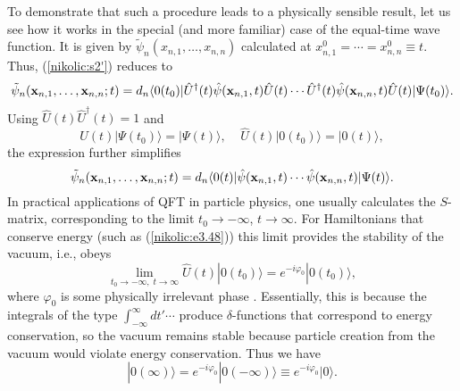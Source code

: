 \documentclass[12pt,twoside]{report} %
\begin{document}
To demonstrate that such a procedure leads to a physically sensible result,
let us see how it works in the special (and more familiar) case of the equal-time
wave function. It is given by $\tilde{\psi}_n(x_{n,1},\ldots,x_{n,n})$ 
calculated at $x^0_{n,1}=\cdots=x^0_{n,n}\equiv t$.
Thus, (\ref{nikolic:s2'}) reduces to
\begin{equation}\label{nikolic:e3.51}
 \tilde{\psi}_n({\bf x}_{n,1},\ldots,{\bf x}_{n,n};t) = d_n
\langle 0(t_0)|  \hat{U}^\dagger(t) \hat{\psi}({\bf x}_{n,1},t) \hat{U}(t) 
 \cdots
\hat{U}^\dagger(t) \hat{\psi}({\bf x}_{n,n},t) \hat{U}(t)   |\Psi(t_0)\rangle .  
\end{equation}
Using $\hat{U}(t)\hat{U}^\dagger(t)=1$ and
\begin{equation}\label{nikolic:e3.52}
 \hat{U}(t)   |\Psi(t_0)\rangle = |\Psi(t)\rangle , \;\;\;\;
\hat{U}(t)   |0(t_0)\rangle = |0(t)\rangle ,
\end{equation}
the expression further simplifies 
\begin{equation}\label{nikolic:e3.53}
 \tilde{\psi}_n({\bf x}_{n,1},\ldots,{\bf x}_{n,n};t) = 
 d_n
\langle 0(t)|  \hat{\psi}({\bf x}_{n,1},t)  \cdots
\hat{\psi}({\bf x}_{n,n},t)    |\Psi(t)\rangle . 
\end{equation}
In practical applications of QFT in particle physics, one usually calculates the 
$S$-matrix, corresponding to the limit $t_0\rightarrow -\infty$, 
$t\rightarrow\infty$. For Hamiltonians that conserve energy (such as (\ref{nikolic:e3.48}))
this limit provides the stability of the vacuum, i.e., obeys
\begin{equation}\label{nikolic:e3.54}
\lim_{t_0\rightarrow -\infty, \; t\rightarrow\infty} \hat{U}(t)   |0(t_0)\rangle = 
e^{-i\varphi_0} |0(t_0)\rangle , 
\end{equation}
where $\varphi_0$ is some physically irrelevant phase \cite{bd2}. 
Essentially, this is because the integrals of the type 
$\int_{-\infty}^{\infty} dt' \cdots$ produce $\delta$-functions
that correspond to energy conservation, so the vacuum remains stable
because particle creation from the vacuum would violate energy conservation.
Thus we have
\begin{equation}\label{nikolic:e3.55}
 |0(\infty)\rangle =e^{-i\varphi_0}|0(-\infty)\rangle \equiv  e^{-i\varphi_0}|0\rangle .
\end{equation}
\end{document}
